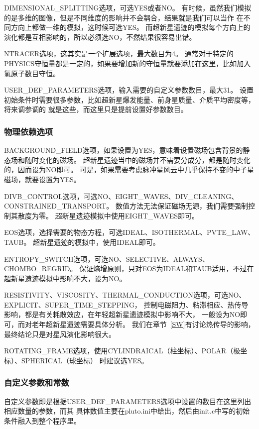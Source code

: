 DIMENSIONAL\_SPLITTING选项，可选YES或者NO。
有时候，虽然我们模拟的是多维的图像，但是不同维度的影响并不会耦合，结果就是我们可以当作
在不同方向上都做一维的模拟，这时候可选YES。
而超新星遗迹的模拟每个方向上的演化都是互相影响的，所以必须选NO，不然结果很容易出错。

NTRACER选项，这其实是一个扩展选项，最大数目为4。
通常对于特定的PHYSICS守恒量都是一定的，如果要增加新的守恒量就要添加在这里，比如加入
氢原子数目守恒。

USER\_DEF\_PARAMETERS选项，输入需要的自定义参数数目，最大31。
设置初始条件时需要很多参数，比如超新星爆发能量、前身星质量、介质平均密度等，将来调参调的
就是这些，而这里只是提前设置好参数数目。

\subsubsection{物理依赖选项}
BACKGROUND\_FIELD选项，如果设置为YES，意味着设置磁场包含背景的静态场和随时变化的磁场。
超新星遗迹当中的磁场并不需要分成分，都是随时变化的，因而设为NO即可。
可是，如果需要考虑脉冲星风云中几乎保持不变的中子星磁场，就要设置为YES。

DIVB\_CONTROL选项，可选NO、EIGHT\_WAVES、DIV\_CLEANING、CONSTRAINED\_TRANSPORT。
数值方法无法保证磁场无源，我们需要强制控制其散度为零。
超新星遗迹模拟中使用EIGHT\_WAVES即可。

EOS选项，选择需要的物态方程，可选IDEAL、ISOTHERMAL、PVTE\_LAW、TAUB。
超新星遗迹的模拟中，使用IDEAL即可。

ENTROPY\_SWITCH选项，可选NO、SELECTIVE、ALWAYS、CHOMBO\_REGRID。
保证熵增原则，只对EOS为IDEAL和TAUB适用，不过在超新星遗迹模拟中影响不大，设为NO。

RESISTIVITY、VISCOSITY、THERMAL\_CONDUCTION选项，可选NO、EXPLICIT、SUPER\_TIME\_STEPPING，
控制电磁阻力、粘滞相应、热传导影响，都是有关耗散效应，在年轻超新星遗迹模拟中影响不大，
一般设为NO即可，而对老年超新星遗迹需要具体分析。
我们在章节~\ref{SW}有讨论热传导的影响，最终结论只是对星风演化影响很大。

ROTATING\_FRAME选项，使用CYLINDRAICAL（柱坐标）、POLAR（极坐标）、SPHERICAL（球坐标）
时建议选YES。

\subsubsection{自定义参数和常数}
自定义参数即是根据USER\_DEF\_PARAMETERS选项中设置的数目在这里列出相应数量的参数，而其
具体数值主要在pluto.ini中给出，然后由init.c中写的初始条件融入到整个程序里。

